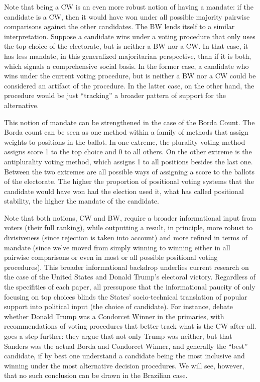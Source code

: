 \documentclass[hidelinks,11pt]{article}
\begin{document}
Note that being a CW is an even more robust notion of having a mandate: if the
candidate is a CW, then it would have won under all possible majority pairwise
comparisons against the other candidates. The BW lends itself to a similar
interpretation. Suppose a candidate wins under a voting procedure that only uses
the top choice of the electorate, but is neither a BW nor a CW. In that case, it
has less mandate, in this generalized majoritarian perspective, than if it is
both, which signals a comprehensive social basis. In the former case, a
candidate who wins under the current voting procedure, but is neither a BW nor a
CW could be considered an artifact of the procedure. In the latter case, on the
other hand, the procedure would be just ``tracking'' a broader pattern of
support for the alternative.


This notion of mandate can be strengthened in the case of the Borda Count. The Borda count can be seen as one method within a family of methods that assign weights to positions in the ballot. In one extreme, the plurality voting method assigns score 1 to the top choice and 0 to all others. On the other extreme is the antiplurality voting method, which assigns 1 to all positions besides the last one. Between the two extremes are all possible ways of assigning a score to the ballots of the electorate. The higher the proportion of positional voting systems that the candidate would have won had the election used it, what \textcite{tabarrok2001president} has called positional stability, the higher the mandate of the candidate.

Note that both notions, CW and BW, require a broader informational input from
voters (their full ranking), while outputting a result, in principle, more
robust to divisiveness (since rejection is taken into account) and more refined
in terms of mandate (since we've moved from simply winning to winning either in
all pairwise comparisons or even in most or all possible positional voting
procedures). This broader informational backdrop underlies current research on
the case of the United States and Donald Trump's electoral victory. Regardless
of the specifities of each paper, all pressupose that the informational paucity
of only focusing on top choices blinds the States' socio-technical translation
of popular support into political input (the choice of candidate).
For instance, \textcite{potthoff2021condorcet, woon2020trump, kurrild2018trump} debate whether
Donald Trump was a Condorcet Winner in the primaries, with recommendations of
voting procedures that better track what is the CW after all.
\textcite{igersheim22_compar_votin_method} goes a step further: they argue that
not only Trump was neither, but that Sanders was the actual Borda and Condorcet
Winner, and generally the ``best'' candidate, if by best one understand a
candidate being the most inclusive and winning under the most alternative
decision procedures. We will see, however, that no such conclusion can be drawn
in the Brazilian case.
\end{document}
